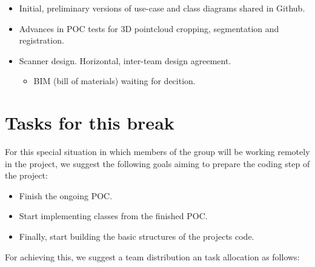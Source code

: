 \documentclass[11pt]{article} %
\begin{document}
\begin{itemize}
\item Initial, preliminary versions of use-case and class diagrams shared in Github.
\item Advances in POC tests for 3D pointcloud cropping, segmentation and registration.
\item Scanner design. Horizontal, inter-team design agreement.
		\begin{itemize}
		\item BIM (bill of materials) waiting for decition.
	\end{itemize}  
\end{itemize}  	

\section{Tasks for this break}
For this special situation in which members of the group will be working remotely in the project,  we suggest the following goals 
aiming to prepare the coding step of the project:
\begin{itemize}
\item Finish the ongoing POC. 
\item Start implementing classes from the finished POC.
\item Finally, start building the basic structures of the projects code.

\end{itemize}


For achieving this, we suggest a team distribution an task allocation as follows:
\end{document}
